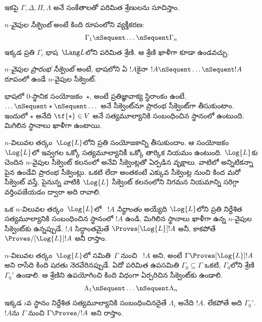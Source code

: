 \documentclass[../../../include/open-logic-section]{subfiles}
\begin{document}


ఇకపై $\Gamma, \Delta, \Pi, \Lambda$ అనే సంకేతాలతో
 పరిమిత శ్రేణులను సూచిస్తాం.

\begin{defn}[సీక్వెంట్]
\emph{$n$-వైపుల సీక్వెంట్} అంటే కింది రూపంలోని వ్యక్తీకరణ:
\[
\Gamma_1 \nSequent \dots \nSequent \Gamma_n
\]
ఇక్కడ ప్రతి $\Gamma_i$ భాష~$\Lang L$లోని
 పరిమిత శ్రేణి. ఆ శ్రేణి ఖాళీగా కూడా ఉండవచ్చు.
\end{defn}

\begin{defn}[ప్రారంభ సీక్వెంట్]
\emph{$n$-వైపుల ప్రారంభ సీక్వెంట్} అంటే,
భాషలోని ఏ  $!A$కైనా
$!A \nSequent \dots \nSequent !A$
రూపంలో ఉండే $n$-వైపుల సీక్వెంట్.

భాషలో $0$-స్థానిక సంయోజకం~$\star$,
అంటే ప్రతిజ్ఞావాక్య స్థిరాంకం ఉంటే,
$\dots \nSequent \star \nSequent \dots$
అనే సీక్వెంట్‌నూ ప్రారంభ సీక్వెంట్‌గా
తీసుకుంటాం. ఇందులో $\star$ అనేది $\tf{\star} \in V$
అనే సత్యమూల్యానికి సంబంధించిన స్థానంలో ఉంటుంది.
మిగిలిన స్థానాలు ఖాళీగా ఉంటాయి.
\end{defn}

$n$-విలువల తర్కం~$\Log{L}$లోని ప్రతి సంయోజకాన్ని తీసుకుందాం.
ఆ సంయోజకం $\Log{L}$లో ఇవ్వగల ఒక్కో సత్యమూల్యానికీ
ఒక్కో తార్కిక నియమం ఉంటుంది. $\Log{L}$కు
చెందిన $n$-వైపుల సీక్వెంట్ కలనంలో
   అనేవి
సీక్వెంట్లతో ఏర్పడిన వృక్షాలు. వాటిలో అన్నిటికన్నా
పైన ఉండేవి ప్రారంభ సీక్వెంట్లు. ఒకటి లేదా అంతకంటే ఎక్కువ
సీక్వెంట్ల నుంచి కింద మరో సీక్వెంట్ వస్తే, పైనున్న వాటికి
$\Log{L}$ సీక్వెంట్ కలనంలోని నిగమన నియమాన్ని
సరిగ్గా వర్తింపజేయడం ద్వారా అది రావాలి.

\begin{defn}[సిద్ధాంతాలు]
ఒక $n$-విలువల తర్కం~$\Log{L}$లో
~$!A$
\emph{సిద్ధాంతం} అయ్యేది
$\Log{L}$లోని ప్రతి నిర్దేశిత
సత్యమూల్యానికి సంబంధించిన
స్థానంలో $!A$ ఉండి, మిగిలిన స్థానాలు ఖాళీగా ఉన్న $n$-వైపుల
సీక్వెంట్‌కు  ఉన్నప్పుడే.
$!A$ సిద్ధాంతమైతే
$\Proves[\Log{L}] !A$ అనీ, కాకపోతే
$\Proves/[\Log{L}] !A$ అనీ రాస్తాం.
\end{defn}

\begin{defn}
$n$-విలువల తర్కం~$\Log{L}$లో
 సమితి~$\Gamma$
నుంచి ~$!A$
\emph{}
అని, అంటే $\Gamma \Proves[\Log{L}] !A$ అని రాసేది
కింది షరతు నెరవేరినప్పుడే. ఏదో పరిమిత ఉపసమితి
$\Gamma_0 \subseteq \Gamma$ ఒకటి, $\Gamma_0$లోని
 శ్రేణి $\Gamma_0'$ ఉండాలి.
ఆ శ్రేణిని ఉపయోగించి కింది విధంగా ఏర్పరిచిన సీక్వెంట్‌కు
 ఉండాలి.
\[ \Lambda_1 \nSequent \dots \nSequent \Lambda_n \]
ఇక్కడ $i$వ స్థానం నిర్దేశిత సత్యమూల్యానికి సంబంధించినదైతే
$\Lambda_i$ అనేది $!A$. లేకపోతే
అది $\Gamma_0'$.
$!A$ను $\Gamma$ నుంచి
$\Gamma \Proves/ !A$ అని రాస్తాం.
\end{defn}
\end{document}
